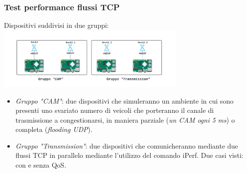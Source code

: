 \documentclass{beamer}
\begin{document}
\begin{frame}
\begin{minipage}{0.35\textwidth}
    \end{minipage}
\end{frame}

\begin{frame}
    \frametitle{Test performance flussi TCP}
    Dispositivi suddivisi in due gruppi:
    \centering
    \includegraphics[width=0.7\textwidth]{Rock scheme.png}
    \begin{itemize}
        \item \textit{Gruppo "CAM"}: due dispositivi che simuleranno un ambiente in cui sono presenti uno svariato numero di veicoli che porteranno il canale di trasmissione a congestionarsi, in maniera parziale (\textit{un CAM ogni 5 ms}) o completa (\textit{flooding UDP}).
        \item \textit{Gruppo "Transmission"}: due dispositivi che comunicheranno mediante due flussi TCP in parallelo mediante l'utilizzo del comando iPerf. Due casi visti: con e senza QoS.
    \end{itemize}
\end{frame}
\end{document}
